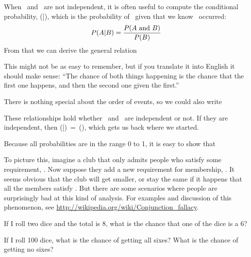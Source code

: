 \documentclass[12pt]{book}
\begin{document}
When \A~and \B~are not independent, it is often useful to compute
the conditional probability, \Prob(\A|\B), which is the probability of
\A~given that we know \B~occurred:
%
\[ P(A|B) = \frac{P(A ~\mbox{and}~ B)}{P(B)} \]
%
From that we can derive the general relation

\Eqn{ \Prob(\A \AND \B) = \Prob(\A) \Prob(\B|\A) }

This might not be as easy to remember, but if you translate it into
English it should make sense: ``The chance of both things happening
is the chance that the first one happens, and then the second one
given the first.''

There is nothing special about the order of events, so we could also
write

\Eqn{ \Prob(\A \AND \B) = \Prob(\B) \Prob(\A|\B) }

These relationships hold whether \A~and \B~are independent or not.
If they are independent, then \Prob(\A|\B)~=~\Prob(\A), which gets us back
where we started.

Because all probabilities are in the range 0 to 1, it is
easy to show that 

\Eqn{ \Prob(\A \AND \B)~\myle~\Prob(\A) }

To picture this, imagine a club that only admits people who satisfy
some requirement, \A.  Now suppose they add a new requirement for
membership, \B.  It seems obvious that the club will get smaller, or
stay the same if it happens that all the members satisfy \B.  But
there are some scenarios where people are surprisingly bad at this
kind of analysis.  For examples and discussion of this phenomenon, see
\url{http://wikipedia.org/wiki/Conjunction_fallacy}.

\begin{exercise}
If I roll two dice and the total is 8, what is the chance that
one of the dice is a 6?

\end{exercise}

\begin{exercise}
If I roll 100 dice, what is the chance of getting all sixes?
What is the chance of getting no sixes?

\end{exercise}
\end{document}
